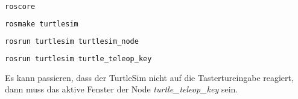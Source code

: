 \begin{lstlisting}[language=bash]
roscore
\end{lstlisting}

\begin{lstlisting}[language=bash]
rosmake turtlesim
\end{lstlisting}

\begin{lstlisting}[language=bash]
rosrun turtlesim turtlesim_node
\end{lstlisting}

\begin{lstlisting}[language=bash]
rosrun turtlesim turtle_teleop_key
\end{lstlisting}

Es kann passieren, dass der TurtleSim nicht auf die Tastertureingabe reagiert, dann muss das aktive Fenster der Node \textit{turtle\_teleop\_key} sein.


